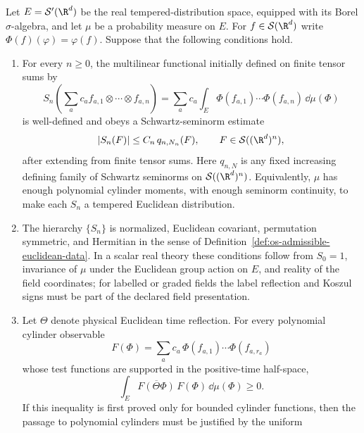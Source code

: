 \begin{remark}
\label{rem:spde-invariant-law-os-reconstruction-criterion}
Let \(E=\mathcal S'(\R^d)\) be the real tempered-distribution space,
equipped with its Borel \(\sigma\)-algebra, and let \(\mu\) be a probability
measure on \(E\).  For \(f\in\mathcal S(\R^d)\) write
\(\Phi(f)(\varphi)=\varphi(f)\).  Suppose that the following conditions
hold.
\begin{enumerate}[label=(\roman*)]
  \item For every \(n\geq0\), the multilinear functional initially defined on
  finite tensor sums by
  \[
    S_n\!\left(\sum_a c_a f_{a,1}\otimes\cdots\otimes f_{a,n}\right)
    =
    \sum_a c_a
    \int_E
      \Phi(f_{a,1})\cdots\Phi(f_{a,n})\,\dd\mu(\Phi)
  \]
  is well-defined and obeys a Schwartz-seminorm estimate
  \begin{equation}
    |S_n(F)|\leq C_n\,q_{n,N_n}(F),
    \qquad F\in \mathcal S((\R^d)^n),
    \label{eq:spde-os-moment-continuity}
  \end{equation}
  after extending from finite tensor sums.  Here \(q_{n,N}\) is any fixed
  increasing defining family of Schwartz seminorms on
  \(\mathcal S((\R^d)^n)\).  Equivalently, \(\mu\) has enough polynomial
  cylinder moments, with enough seminorm continuity, to make each \(S_n\) a
  tempered Euclidean distribution.
  \item The hierarchy \(\{S_n\}\) is normalized, Euclidean covariant,
  permutation symmetric, and Hermitian in the sense of
  Definition~\ref{def:os-admissible-euclidean-data}.  In a scalar real
  theory these conditions follow from \(S_0=1\), invariance of \(\mu\) under
  the Euclidean group action on \(E\), and reality of the field coordinates;
  for labelled or graded fields the label reflection and Koszul signs must
  be part of the declared field presentation.
  \item Let \(\Theta\) denote physical Euclidean time reflection.  For every
  polynomial cylinder observable
  \[
    F(\Phi)=
    \sum_a c_a\,\Phi(f_{a,1})\cdots\Phi(f_{a,r_a})
  \]
  whose test functions are supported in the positive-time half-space,
  \begin{equation}
    \int_E \overline{F(\Theta\Phi)}\,F(\Phi)\,\dd\mu(\Phi)\geq0 .
    \label{eq:spde-os-cylinder-positivity}
  \end{equation}
  If this inequality is first proved only for bounded cylinder functions,
  then the passage to polynomial cylinders must be justified by the uniform

\end{enumerate}
\end{remark}
